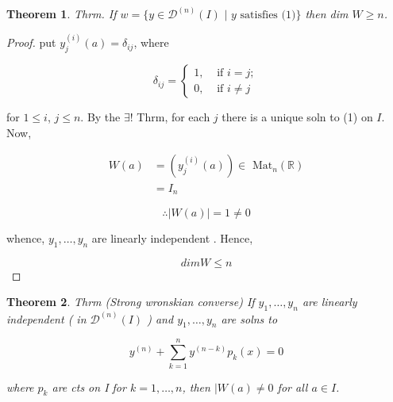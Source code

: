 \documentclass{book}
\newtheorem*{theorem}{Theorem}
\theoremstyle{definition}
\begin{document}
\begin{theorem}
  Thrm. If \( w = \{ y \in \mathscr{D}^{(n)} (I) \text{ | } y \text{ satisfies (1)}
  \} \) then
  dim \( W \geq n \). \\[5mm]
\end{theorem}

\begin{proof}
  put \( y^{(i)}_j (a) = \delta_{ij} \),  where

  \[ 
  \delta_{ij} =
  \begin{cases}
    1, & \text{ if } i = j; \\
    0, & \text{ if } i \neq j
  \end{cases}
  \]

  for \( 1 \leq i \), \( j \leq n \). By the \( \exists \)! Thrm, for each
  \( j \) there is a unique soln to (1) on \( I \). Now, 

  \begin{align*}
    W(a) &= (y_j^{(i)}(a) ) \in \text{ Mat}_n( \mathbb{R}) \\
    &= I_n
  \end{align*}

  \[ \therefore |W(a)|=1 \neq 0 \]

  whence, \( y_1, \dots , y_n \) are linearly independent . Hence,

  \[ dim W \leq n  \]
\end{proof}

\begin{theorem}
  Thrm (Strong wronskian converse) If \( y_1, \dots , y_n \) are linearly
  independent ( in \( \mathscr{D}^{(n)} (I) \) ) and \( y_1, \dots , y_n
  \) are solns to 


  \[ y^{(n)} + \sum_{k=1}^n y^{(n-k)} p_k(x) = 0 \]

  where \( p_k \) are cts on I for \( k=1, \dots , n \), then \( |W(a)
  \neq 0  \) for all \( a \in I \). 
\end{theorem}
\end{document}
